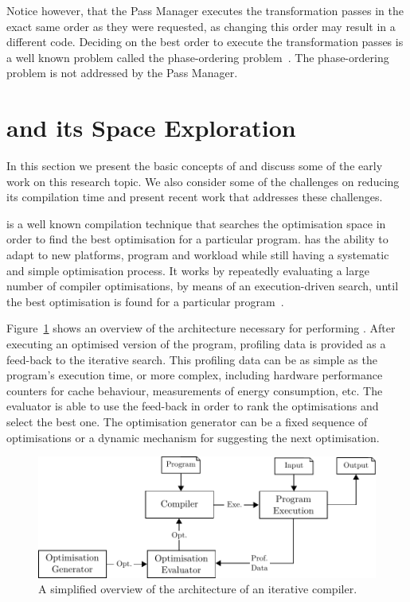Notice however, that the Pass Manager executes the transformation passes in the exact same order as they were requested, as changing this order may result in a different code.
Deciding on the best order to execute the transformation passes is a well known problem called the phase-ordering problem~\citep{touati06,kulkarni12,jantz14}.
The phase-ordering problem is not addressed by the Pass Manager.

\section{{\IterComp} and its Space Exploration}

In this section we present the basic concepts of {\itercomp} and discuss some of the early work on this research topic.
We also consider some of the challenges on reducing its compilation time and present recent work that addresses these challenges.

{\Itercomp} is a well known compilation technique that searches the optimisation space in order to find the best optimisation for a particular program.
{\Itercomp} has the ability to adapt to new platforms, program and workload while still having a systematic and simple optimisation process.
It works by repeatedly evaluating a large number of compiler optimisations, by means of an execution-driven search, until the best optimisation is found for a particular program~\citep{kisuki99,fursin07,chen10}.

Figure~\ref{fig:itercomp-diagram} shows an overview of the architecture necessary for performing {\itercomp}.
After executing an optimised version of the program, profiling data is provided as a feed-back to the iterative search.
This profiling data can be as simple as the program's execution time, or more complex, including hardware performance counters for cache behaviour, measurements of energy consumption, etc.
The evaluator is able to use the feed-back in order to rank the optimisations and select the best one.
The optimisation generator can be a fixed sequence of optimisations or a dynamic mechanism for suggesting the next optimisation.

\begin{figure}[htb]
    \centering
    \includegraphics[width=\linewidth]{figs/itercomp-diagram}
    \caption{A simplified overview of the architecture of an iterative compiler.}
    \label{fig:itercomp-diagram}
\end{figure}

